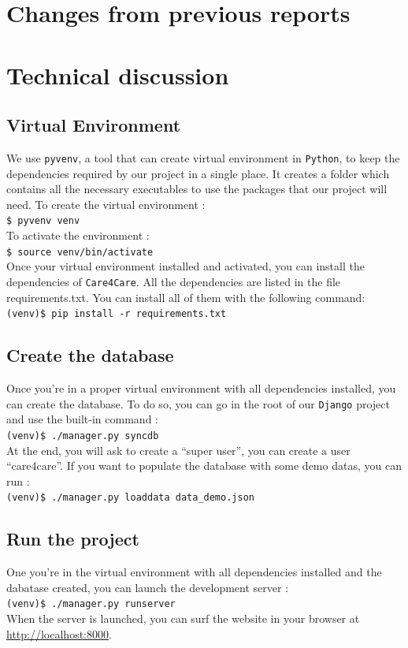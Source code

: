 \documentclass[11pt, a4paper]{article}   	%
\newcommand{\shellcmd}[1]{\\\indent\indent\texttt{\footnotesize\$ #1}\\}
\newcommand{\vshellcmd}[1]{\\\indent\indent\texttt{\footnotesize(venv)\$ #1}\\}
\begin{document}
 



\section{Changes from previous reports}

\section{Technical discussion}

\subsection{Virtual Environment}

We use \texttt{pyvenv}, a tool that can create virtual environment in \texttt{Python}, to keep the dependencies required by our project in a single place. It creates a folder which contains all the necessary executables to use the packages that our project will need. To create the virtual environment :
\shellcmd{pyvenv venv}
To activate the environment :
\shellcmd{source venv/bin/activate}
Once your virtual environment installed and activated, you can install the dependencies of \texttt{Care4Care}. All the dependencies are listed in the file requirements.txt. You can install all of them with the following command:
\vshellcmd{pip install -r requirements.txt}

\subsection{Create the database}
Once you're in a proper virtual environment with all dependencies installed, you can create the database. To do so, you can go in the root of our \texttt{Django} project and use the built-in command :
\vshellcmd{./manager.py syncdb}
At the end, you will ask to create a ``super user'', you can create a user ``care4care''. If you want to populate the database with some demo datas, you can run :
\vshellcmd{./manager.py loaddata data\_demo.json}

\subsection{Run the project}
One you're in the virtual environment with all dependencies installed and the dabatase created, you can launch the development server :
\vshellcmd{./manager.py runserver}
When the server is launched, you can surf the website in your browser at \url{http://localhost:8000}. 
\end{document}
